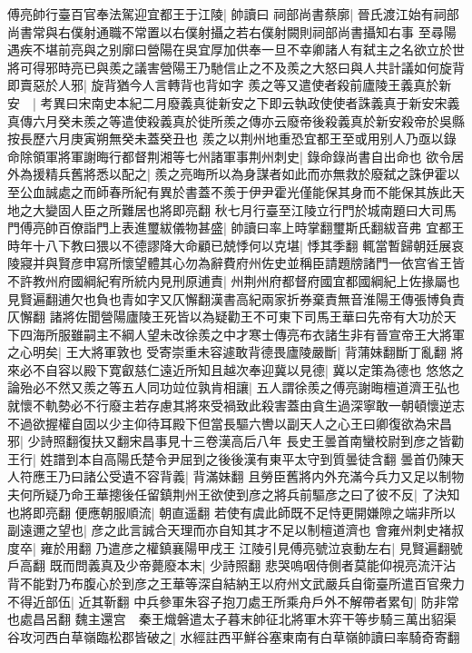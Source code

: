 傅亮帥行臺百官奉法駕迎宜都王于江陵|{
	帥讀曰}
祠部尚書蔡廓|{
	晉氏渡江始有祠部尚書常與右僕射通職不常置以右僕射攝之若右僕射闕則祠部尚書攝知右事}
至尋陽遇疾不堪前亮與之别廓曰營陽在吳宜厚加供奉一旦不幸卿諸人有弑主之名欲立於世將可得邪時亮已與羨之議害營陽王乃馳信止之不及羨之大怒曰與人共計議如何旋背即賣惡於人邪|{
	旋背猶今人言轉背也背如字}
羨之等又遣使者殺前廬陵王義真於新安　|{
	考異曰宋南史本紀二月廢義真徙新安之下即云執政使使者誅義真于新安宋義真傳六月癸未羨之等遣使殺義真於徙所羨之傳亦云廢帝後殺義真於新安殺帝於吳縣按長歷六月庚寅朔無癸未蓋癸丑也}
羨之以荆州地重恐宜都王至或用别人乃亟以錄命除領軍將軍謝晦行都督荆湘等七州諸軍事荆州刺史|{
	錄命錄尚書自出命也}
欲令居外為援精兵舊將悉以配之|{
	羨之亮晦所以為身謀者如此而亦無救於廢弑之誅伊霍以至公血誠處之而師春所紀有異於書蓋不羨于伊尹霍光僅能保其身而不能保其族此天地之大變固人臣之所難居也將即亮翻}
秋七月行臺至江陵立行門於城南題曰大司馬門傅亮帥百僚詣門上表進璽紱儀物甚盛|{
	帥讀曰率上時掌翻璽斯氏翻紱音弗}
宜都王時年十八下教曰猥以不德謬降大命顧已兢悸何以克堪|{
	悸其季翻}
輒當暫歸朝廷展哀陵寢并與賢彦申寫所懷望體其心勿為辭費府州佐史並稱臣請題牓諸門一依宫省王皆不許教州府國綱紀宥所統内見刑原逋責|{
	州荆州府都督府國宜都國綱紀上佐掾屬也見賢遍翻逋欠也負也青如字又仄懈翻漢書高紀兩家折券棄責無音淮陽王傳張博負責仄懈翻}
諸將佐聞營陽廬陵王死皆以為疑勸王不可東下司馬王華曰先帝有大功於天下四海所服雖嗣主不綱人望未改徐羨之中才寒士傳亮布衣諸生非有晉宣帝王大將軍之心明矣|{
	王大將軍敦也}
受寄崇重未容遽敢背德畏廬陵嚴斷|{
	背蒲妹翻斷丁亂翻}
將來必不自容以殿下寛叡慈仁遠近所知且越次奉迎冀以見德|{
	冀以定策為德也}
悠悠之論殆必不然又羨之等五人同功竝位孰肯相讓|{
	五人謂徐羨之傅亮謝晦檀道濟王弘也}
就懷不軌勢必不行廢主若存慮其將來受禍致此殺害蓋由貪生過深寧敢一朝頓懷逆志不過欲握權自固以少主仰待耳殿下但當長驅六轡以副天人之心王曰卿復欲為宋昌邪|{
	少詩照翻復扶又翻宋昌事見十三卷漢高后八年}
長史王曇首南蠻校尉到彦之皆勸王行|{
	姓譜到本自高陽氏楚令尹屈到之後後漢有東平太守到質曇徒含翻}
曇首仍陳天人符應王乃曰諸公受遺不容背義|{
	背滿妹翻}
且勞臣舊將内外充滿今兵力又足以制物夫何所疑乃命王華摠後任留鎮荆州王欲使到彦之將兵前驅彦之曰了彼不反|{
	了決知也將即亮翻}
便應朝服順流|{
	朝直遥翻}
若使有虞此師既不足恃更開嫌隙之端非所以副遠邇之望也|{
	彦之此言誠合天理而亦自知其才不足以制檀道濟也}
會雍州刺史褚叔度卒|{
	雍於用翻}
乃遣彦之權鎮襄陽甲戌王江陵引見傅亮號泣哀動左右|{
	見賢遍翻號戶高翻}
既而問義真及少帝薨廢本末|{
	少詩照翻}
悲哭嗚咽侍側者莫能仰視亮流汗沾背不能對乃布腹心於到彦之王華等深自結納王以府州文武嚴兵自衛臺所遣百官衆力不得近部伍|{
	近其靳翻}
中兵參軍朱容子抱刀處王所乘舟戶外不解帶者累旬|{
	防非常也處昌呂翻}
魏主還宫　秦王熾磐遣太子暮末帥征北將軍木弈干等步騎三萬出貂渠谷攻河西白草嶺臨松郡皆破之|{
	水經註西平鮮谷塞東南有白草嶺帥讀曰率騎奇寄翻}
